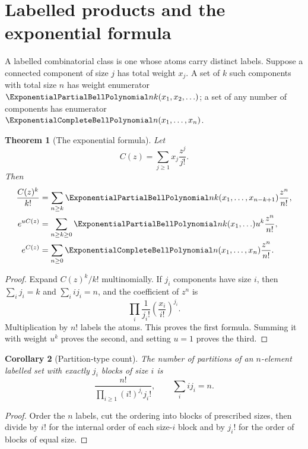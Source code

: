 \documentclass[11pt,a4paper,oneside,openany]{book}
\newtheorem{theorem}{Theorem}[chapter]
\newtheorem{corollary}[theorem]{Corollary}
\theoremstyle{definition}
\theoremstyle{remark}
\begin{document}
\section{Labelled products and the exponential formula}
A labelled combinatorial class is one whose atoms carry distinct labels.  Suppose a
connected component of size $j$ has total weight $x_j$.  A set of $k$ such components
with total size $n$ has weight enumerator $\ExponentialPartialBellPolynomial nk(x_1,x_2,\ldots)$; a set of any
number of components has enumerator $\ExponentialCompleteBellPolynomial n(x_1,\ldots,x_n)$.

\begin{theorem}[The exponential formula]\label{thm:exponential-formula}
Let
\[
 C(z)=\sum_{j\ge1}x_j\frac{z^j}{j!}.
\]
Then
\begin{align}
 \frac{C(z)^k}{k!}
  &=\sum_{n\ge k}\ExponentialPartialBellPolynomial nk(x_1,\ldots,x_{n-k+1})\frac{z^n}{n!},
  \label{eq:partial-bell-egf}\\
 e^{uC(z)}
  &=\sum_{n\ge k\ge0}\ExponentialPartialBellPolynomial nk(x_1,\ldots)u^k\frac{z^n}{n!},
  \label{eq:bivariate-bell-egf}\\
 e^{C(z)}
  &=\sum_{n\ge0}\ExponentialCompleteBellPolynomial n(x_1,\ldots,x_n)\frac{z^n}{n!}.
  \label{eq:complete-bell-egf}
\end{align}
\end{theorem}
\begin{proof}
Expand $C(z)^k/k!$ multinomially.  If $j_i$ components have size $i$, then
$\sum_i j_i=k$ and $\sum_iij_i=n$, and the coefficient of $z^n$ is
\[
 \prod_i\frac1{j_i!}\left(\frac{x_i}{i!}\right)^{j_i}.
\]
Multiplication by $n!$ labels the atoms.  This proves the first formula.  Summing it
with weight $u^k$ proves the second, and setting $u=1$ proves the third.
\end{proof}

\begin{corollary}[Partition-type count]\label{cor:partition-type}
The number of partitions of an $n$-element labelled set with exactly $j_i$ blocks of
size $i$ is
\begin{equation}\label{eq:partition-type-count}
 \frac{n!}{\prod_{i\ge1}(i!)^{j_i}j_i!},
 \qquad \sum_iij_i=n.
\end{equation}
\end{corollary}
\begin{proof}
Order the $n$ labels, cut the ordering into blocks of prescribed sizes, then divide
by $i!$ for the internal order of each size-$i$ block and by $j_i!$ for the order of
blocks of equal size.
\end{proof}
\end{document}
